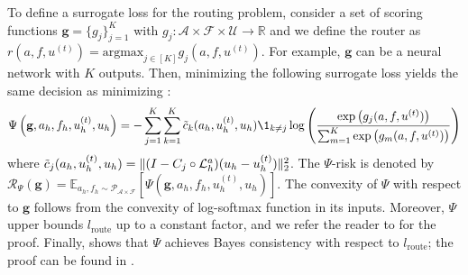\documentclass{article} %
\begin{document}
To define a surrogate loss for the routing problem, consider a set of scoring functions $\mathbf{g} =\{g_j\}_{j = 1}^K$ with $g_j: \mathcal{A} \times \mathcal{F} \times \mathcal{U} \to \mathbb{R}$ and we define the router as $r(a, f, u^{(t)}) = \text{argmax}_{j \in [K]} g_j(a, f, u^{(t)})$. For example, $\mathbf{g}$ can be a neural network with $K$ outputs. Then, minimizing the following surrogate loss yields the same decision as minimizing :
\begin{equation} \label{eq:routersurrogate}
    \Psi\left(\mathbf{g}, a_h, f_h, u^{(t)}_h, u_h\right) = -\sum_{j = 1}^K \sum_{k = 1}^K\Tilde{c}_k(a_h, u^{(t)}_h, u_h)\1_{k\neq j}\log\left(\frac{\exp\left(g_j(a, f, u^{(t)})\right)}{\sum_{m = 1}^K\exp\left(g_m(a, f, u^{(t)})\right)}\right)
\end{equation}
where $\Tilde{c}_j(a_h, u^{(t)}_h, u_h) = \|( I - C_{j} \circ \mathcal{L}_{h}^a)(u_h - u^{(t)}_h)\|^2_2$.
The $\Psi$-risk is denoted by $\mathcal{R}_{\Psi}(\mathbf{g}) = \mathbb{E}_{a_h, f_h \sim \mathcal{P}_{\mathcal{A} \times \mathcal{F}}}[\Psi(\mathbf{g}, a_h, f_h, u^{(t)}_h, u_h)]$. The convexity of $\Psi$ with respect to $\mathbf{g}$ follows from the convexity of log-softmax function in its inputs. Moreover, $\Psi$ upper bounds $l_{\text{route}}$ up to a constant factor, and we refer the reader to  for the proof. Finally,  shows that $\Psi$ achieves Bayes consistency with respect to $l_{\text{route}}$; the proof can be found in .
\end{document}
